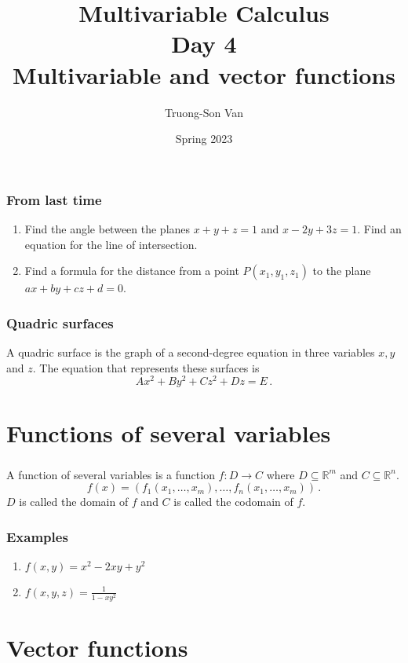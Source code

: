 \documentclass[aspectratio=169]{beamer}
\title{ Multivariable Calculus \\ Day 4 \\ Multivariable and vector functions}
\institute{Fulbright University Vietnam}
\author{Truong-Son Van}
\date{Spring 2023}
\newcommand{\R}{\mathbb{R}}
\begin{document}
\maketitle


\begin{frame}
    \frametitle{From last time}
    \begin{enumerate}
        \item Find the angle between the planes $x+y+z = 1$ and 
            $x -2y + 3z =1$. Find an equation for the line of intersection.
        \item Find a formula for the distance from a point $P(x_1,y_1,z_1)$
            to the plane $ax +by + cz +d = 0 $.
    \end{enumerate}
\end{frame}

\begin{frame}
    \frametitle{Quadric surfaces}
    A quadric surface is the graph of a second-degree equation in three variables
    $x,y$ and $z$. 
    The equation that represents these surfaces is
    $$Ax^2 + By^2 + Cz^2 + Dz = E\,.$$
\end{frame}


\section{Functions of several variables}
\begin{frame}
\begin{definition}
    \frametitle{\secname}
A function of several variables is a function
$f: D \to C$ where $D \subseteq \R^m$ and $C \subseteq \R^n$.
$$f({x}) = ( f_1(x_1,\dots, x_m),\dots, f_n(x_1,\dots, x_m)  ) \,.$$
$D$ is called the domain of $f$ and $C$ is called the codomain of $f$.
\end{definition}
\end{frame}

\begin{frame}
    \frametitle{Examples}

    \begin{enumerate}
        \item $f(x,y) = x^2 - 2xy + y^2$
        \item $f(x,y,z) = \frac{1}{1 - xy^2}$
    \end{enumerate}

\end{frame}

\section{Vector functions}
\end{document}
